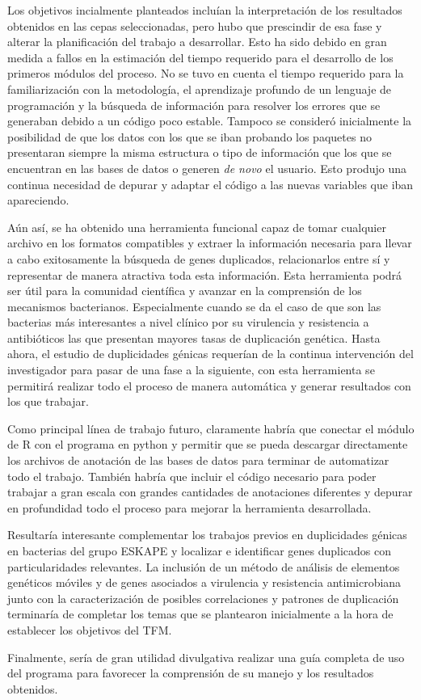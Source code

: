 Los objetivos incialmente planteados incluían la interpretación de los resultados obtenidos en las cepas seleccionadas, pero hubo que prescindir de esa fase y alterar la planificación del trabajo a desarrollar. Esto ha sido debido en gran medida a fallos en la estimación del tiempo requerido para el desarrollo de los primeros módulos del proceso. No se tuvo en cuenta el tiempo requerido para la familiarización con la metodología, el aprendizaje profundo de un lenguaje de programación y la búsqueda de información para resolver los errores que se generaban debido a un código poco estable. Tampoco se consideró inicialmente la posibilidad de que los datos con los que se iban probando los paquetes no presentaran siempre la misma estructura o tipo de información que los que se encuentran en las bases de datos o generen \textit{de novo} el usuario. Esto produjo una continua necesidad de depurar y adaptar el código a las nuevas variables que iban apareciendo.

Aún así, se ha obtenido una herramienta funcional capaz de tomar cualquier archivo en los formatos compatibles y extraer la información necesaria para llevar a cabo exitosamente la búsqueda de genes duplicados, relacionarlos entre sí y representar de manera atractiva toda esta información. Esta herramienta podrá ser útil para la comunidad científica y avanzar en la comprensión de los mecanismos bacterianos. Especialmente cuando se da el caso de que son las bacterias más interesantes a nivel clínico por su virulencia y resistencia a antibióticos las que presentan mayores tasas de duplicación genética. Hasta ahora, el estudio de duplicidades génicas requerían de la continua intervención del investigador para pasar de una fase a la siguiente, con esta herramienta se permitirá realizar todo el proceso de manera automática y generar resultados con los que trabajar.


Como principal línea de trabajo futuro, claramente habría que conectar el módulo de R con el programa en python y permitir que se pueda descargar directamente los archivos de anotación de las bases de datos para terminar de automatizar todo el trabajo. También habría que incluir el código necesario para poder trabajar a gran escala con grandes cantidades de anotaciones diferentes y depurar en profundidad todo el proceso para mejorar la herramienta desarrollada. 

Resultaría interesante complementar los trabajos previos en duplicidades génicas en bacterias del grupo ESKAPE y localizar e identificar genes duplicados con particularidades relevantes. La inclusión de un método de análisis de elementos genéticos móviles y de genes asociados a virulencia y resistencia antimicrobiana junto con la caracterización de posibles correlaciones y patrones de duplicación terminaría de completar los temas que se plantearon inicialmente a la hora de establecer los objetivos del TFM.

Finalmente, sería de gran utilidad divulgativa realizar una guía completa de uso del programa para favorecer la comprensión de su manejo y los resultados obtenidos.

